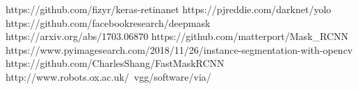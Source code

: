 \begin{thebibliography}{20}%



 https://github.com/fizyr/keras-retinanet
 https://pjreddie.com/darknet/yolo
 https://github.com/facebookresearch/deepmask
 https://arxiv.org/abs/1703.06870
 https://github.com/matterport/Mask\_RCNN
 https://www.pyimagesearch.com/2018/11/26/instance-segmentation-with-opencv
 https://github.com/CharlesShang/FastMaskRCNN
 http://www.robots.ox.ac.uk/~vgg/software/via/

\end{thebibliography}

